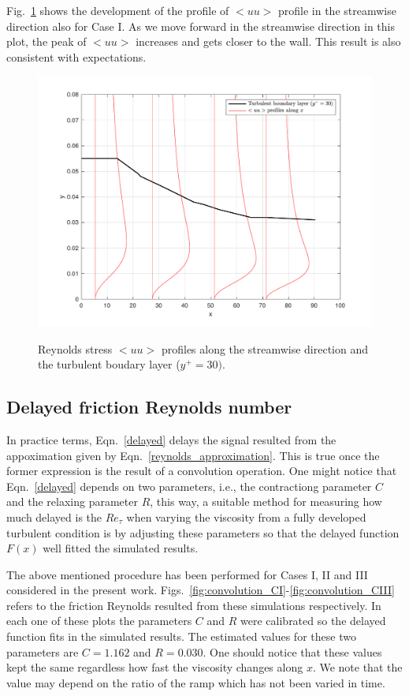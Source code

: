 \documentclass[twocolumn,10pt]{asme2e}
\begin{document}
Fig.~\ref{fig:uu_CI} shows the development of the profile of \(<uu>\) profile in the streamwise direction also for Case I. As we move forward in the streamwise direction in this plot, the peak of \(<uu>\) increases and gets closer to the wall. This result is also consistent with expectations.

\begin{figure}[t]
\centering
\scalebox{0.5}
{\includegraphics{uu_CI.pdf}}
\caption{Reynolds stress \(<uu>\) profiles along the streamwise direction and the turbulent boudary layer (\(y^+=30)\).}
\label{fig:uu_CI}
\end{figure}

\subsection*{Delayed friction Reynolds number}

In practice terms, Eqn.~\ref{delayed} delays the signal resulted from the appoximation given by Eqn.~\ref{reynolds_approximation}. This is true once the former expression is the result of a convolution operation. One might notice that Eqn.~\ref{delayed} depends on two parameters, i.e., the contractiong parameter \(C\) and the relaxing parameter \(R\), this way, a suitable method for measuring how much delayed is the \(Re_{\tau}\) when varying the viscosity from a fully developed turbulent condition is by adjusting these parameters so that the delayed function \(F(x)\) well fitted the simulated results.

The above mentioned procedure has been performed for Cases I, II and III considered in the present work. Figs.~\ref{fig:convolution_CI}-\ref{fig:convolution_CIII} refers to the friction Reynolds resulted from these simulations respectively. In each one of these plots the parameters \(C\) and \(R\) were calibrated so the delayed function fits in the simulated results. The estimated values for these two parameters are \(C=1.162\) and \(R=0.030\). One should notice that these values kept the same regardless how fast the viscosity changes along \(x\). We note that the value may depend on the ratio of the ramp which has not been varied in time.
\end{document}
